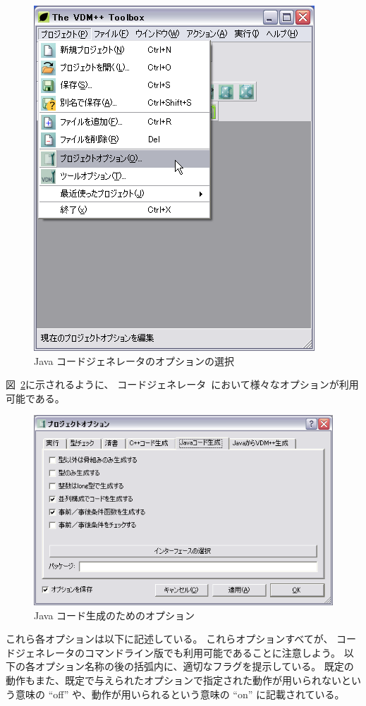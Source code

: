 \documentclass[\pformat,11pt]{jarticle}
\newcommand{\tcg}{コードジェネレータ}
\begin{document}
\begin{figure}[H]
\begin{center}
\includegraphics[width=.8\textwidth]{optionsmenu}
\caption{Java コードジェネレータのオプションの選択}\label{fig:optionsmenu}
\end{center}
\end{figure}

図~\ref{fig:options}に示されるように、 \tcg\ において様々なオプションが利用可能である。
\begin{figure}
\begin{center}
\includegraphics[width=.8\textwidth]{options}
\caption{Java コード生成のためのオプション}\label{fig:options}
\end{center}
\end{figure}
これら各オプションは以下に記述している。
これらオプションすべてが、 \tcg のコマンドライン版でも利用可能であることに注意しよう。
以下の各オプション名称の後の括弧内に、適切なフラグを提示している。
既定の動作もまた、既定で与えられたオプションで指定された動作が用いられないという意味の ``off'' や、動作が用いられるという意味の ``on'' に記載されている。
\end{document}

